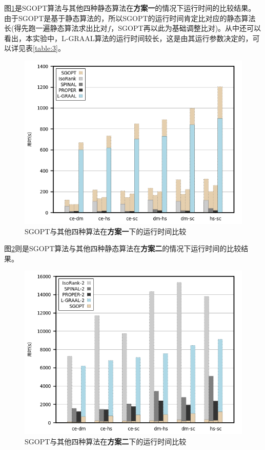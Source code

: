 图\ref{fig:allt}是SGOPT算法与其他四种静态算法在\textbf{方案一}的情况下运行时间的比较结果。由于SGOPT是基于静态算法的，所以SGOPT的运行时间肯定比对应的静态算法长(得先跑一遍静态算法求出比对$f$，SGOPT再以此为基础调整比对)。从中还可以看出，本实验中，L-GRAAL算法的运行时间较长，这是由其运行参数决定的，可以详见表\ref{table:3}。
\begin{figure}[htbp]
\centering
\includegraphics[height=0.25\textheight]{pic/allt.png}
\caption{SGOPT与其他四种算法在\textbf{方案一}下的运行时间比较} 
\label{fig:allt}
\end{figure}

图\ref{fig:allt2}则是SGOPT算法与其他四种静态算法在\textbf{方案二}的情况下运行时间的比较结果。
\begin{figure}[htbp]
\centering
\includegraphics[height=0.25\textheight]{pic/allt2.png}
\caption{SGOPT与其他四种算法在\textbf{方案二}下的运行时间比较} 
\label{fig:allt2}
\end{figure}


